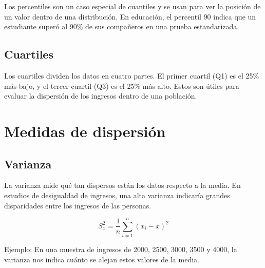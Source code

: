 \documentclass[
  letterpaper,
  DIV=11,
  numbers=noendperiod]{scrreprt}
\begin{document}
Los percentiles son un caso especial de cuantiles y se usan para ver la
posición de un valor dentro de una distribución. En educación, el
percentil 90 indica que un estudiante superó al 90\% de sus compañeros
en una prueba estandarizada.

\subsection{Cuartiles}\label{cuartiles}

Los cuartiles dividen los datos en cuatro partes. El primer cuartil (Q1)
es el 25\% más bajo, y el tercer cuartil (Q3) es el 25\% más alto. Estos
son útiles para evaluar la dispersión de los ingresos dentro de una
población.

\section{Medidas de dispersión}\label{medidas-de-dispersiuxf3n}

\subsection{Varianza}\label{varianza}

La varianza mide qué tan dispersos están los datos respecto a la media.
En estudios de desigualdad de ingresos, una alta varianza indicaría
grandes disparidades entre los ingresos de las personas.

\begin{tcolorbox}[enhanced jigsaw, toprule=.15mm, opacitybacktitle=0.6, toptitle=1mm, arc=.35mm, left=2mm, title=\textcolor{quarto-callout-warning-color}{\faExclamationTriangle}\hspace{0.5em}{Warning}, titlerule=0mm, leftrule=.75mm, rightrule=.15mm, coltitle=black, bottomtitle=1mm, bottomrule=.15mm, colframe=quarto-callout-warning-color-frame, opacityback=0, colback=white, breakable, colbacktitle=quarto-callout-warning-color!10!white]

\[ S_x^2 =\frac{1}{n} \sum\limits_{i=1}^n (x_i-\overline{x})^2\]

\end{tcolorbox}

\begin{tcolorbox}[enhanced jigsaw, toprule=.15mm, opacitybacktitle=0.6, toptitle=1mm, arc=.35mm, left=2mm, title=\textcolor{quarto-callout-tip-color}{\faLightbulb}\hspace{0.5em}{Tip}, titlerule=0mm, leftrule=.75mm, rightrule=.15mm, coltitle=black, bottomtitle=1mm, bottomrule=.15mm, colframe=quarto-callout-tip-color-frame, opacityback=0, colback=white, breakable, colbacktitle=quarto-callout-tip-color!10!white]

Ejemplo: En una muestra de ingresos de 2000, 2500, 3000, 3500 y 4000, la
varianza nos indica cuánto se alejan estos valores de la media.

\end{tcolorbox}
\end{document}
